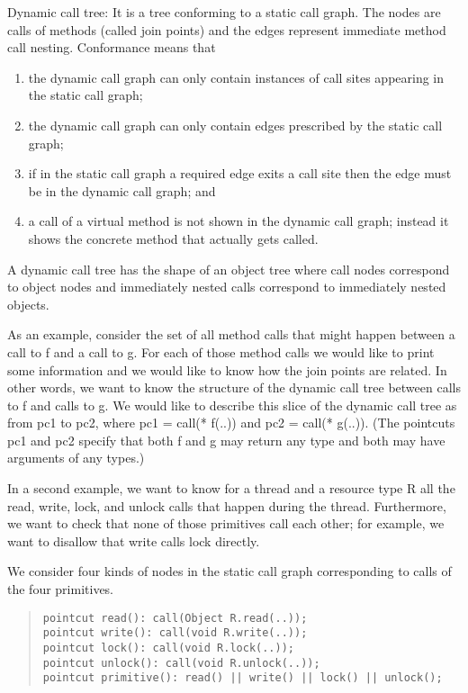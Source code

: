 \begin{itemize}
Dynamic call tree: It is a tree conforming to a static call graph. The
nodes are calls of methods (called join points) and the edges
represent immediate method call nesting. Conformance means that
\begin{enumerate}
\item the dynamic call graph can only contain instances of call sites
      appearing in the static call graph;
\item the dynamic call graph can only contain edges prescribed by the
      static call graph;
\item if in the static call graph a required edge exits a call site
      then the edge must be in the dynamic call graph; and
\item a call of a virtual method is not shown in the dynamic call
      graph; instead it shows the concrete method that actually gets
      called.
\end{enumerate} 
A dynamic call tree has the shape of an object tree where call nodes
correspond to object nodes and immediately nested calls correspond to
immediately nested objects.

As an example, consider the set of all method calls that might happen
between a call to {\sf f} and a call to {\sf g}. For each of those
method calls we would like to print some information and we would like
to know how the join points are related. In other words, we want to
know the structure of the dynamic call tree between calls to {\sf f}
and calls to {\sf g}. We would like to describe this slice of the
dynamic call tree as {\sf from pc1 to pc2}, where {\sf pc1 = call(*
f(..))} and {\sf pc2 = call(* g(..))}.  (The pointcuts {\sf pc1} and
{\sf pc2} specify that both {\sf f} and {\sf g} may return any type
and both may have arguments of any types.)

In a second example, we want to know for a thread and a resource type
{\sf R} all the {\sf read}, {\sf write}, {\sf lock}, and {\sf unlock}
calls that happen during the thread.  Furthermore, we want to check
that none of those primitives call each other; for example, we want to
disallow that {\sf write} calls {\sf lock} directly.

We consider four kinds of nodes in the static call graph corresponding
to calls of the four primitives.
\begin{quote}
\begin{verbatim}
pointcut read(): call(Object R.read(..));
pointcut write(): call(void R.write(..));
pointcut lock(): call(void R.lock(..));
pointcut unlock(): call(void R.unlock(..));
pointcut primitive(): read() || write() || lock() || unlock();
\end{verbatim}
\end{quote}


\end{itemize}
